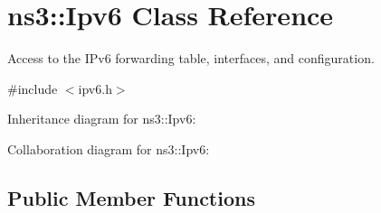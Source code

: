 \hypertarget{classns3_1_1Ipv6}{}\section{ns3\+:\+:Ipv6 Class Reference}
\label{classns3_1_1Ipv6}


Access to the I\+Pv6 forwarding table, interfaces, and configuration.  




{\ttfamily \#include $<$ipv6.\+h$>$}



Inheritance diagram for ns3\+:\+:Ipv6\+:


Collaboration diagram for ns3\+:\+:Ipv6\+:
\subsection*{Public Member Functions}
